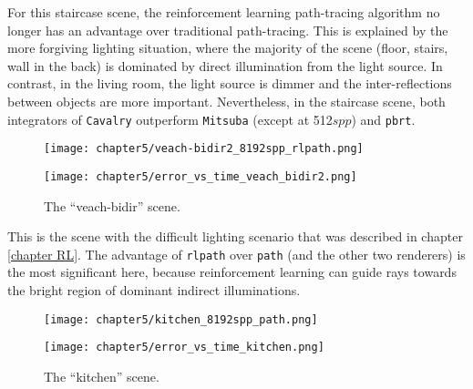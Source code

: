 For this staircase scene, the reinforcement learning path-tracing algorithm no longer has an advantage over traditional path-tracing. This is explained by the more forgiving lighting situation, where the majority of the scene (floor, stairs, wall in the back) is dominated by direct illumination from the light source. In contrast, in the living room, the light source is dimmer and the inter-reflections between objects are more important. Nevertheless, in the staircase scene, both integrators of \texttt{Cavalry} outperform \texttt{Mitsuba} (except at 512$spp$) and \texttt{pbrt}. 

\newpage
\begin{figure}[H]
    \centering
    
    \begin{minipage}[t]{.99\textwidth}
        \centering
        \vspace{0pt}
        \texttt{[image: chapter5/veach-bidir2\_8192spp\_rlpath.png]}
    \end{minipage}
    
    \vspace{0.3cm}

    \begin{minipage}[t]{.99\textwidth}
        \centering
        \vspace{0pt}
        \texttt{[image: chapter5/error\_vs\_time\_veach\_bidir2.png]}
    \end{minipage}
    
    \caption{The ``veach-bidir'' scene.}
\end{figure}

This is the scene with the difficult lighting scenario that was described in chapter \ref{chapter RL}. The advantage of \texttt{rlpath} over \texttt{path} (and the other two renderers) is the most significant here, because reinforcement learning can guide rays towards the bright region of dominant indirect illuminations.


\newpage
\begin{figure}[H]
    \centering
    
    \begin{minipage}[t]{.99\textwidth}
        \centering
        \vspace{0pt}
        \texttt{[image: chapter5/kitchen\_8192spp\_path.png]}
    \end{minipage}
    
    \vspace{0.3cm}

    \begin{minipage}[t]{.99\textwidth}
        \centering
        \vspace{0pt}
        \texttt{[image: chapter5/error\_vs\_time\_kitchen.png]}
    \end{minipage}
    
    \caption{The ``kitchen'' scene.}
\end{figure}

